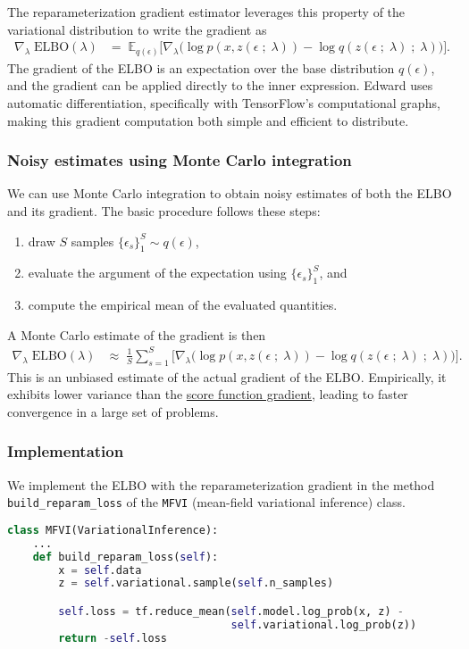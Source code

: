 The reparameterization gradient estimator leverages this property of the
variational distribution to write the gradient as
\begin{align*}
  \nabla_\lambda\;
  \text{ELBO}(\lambda)
  &=\;
  \mathbb{E}_{q(\epsilon)}
  \big[
  \nabla_\lambda
  \big(
  \log p(x, z(\epsilon \;;\; \lambda))
  -
  \log q(z(\epsilon \;;\; \lambda) \;;\;\lambda)
  \big)
  \big].
\end{align*}
The gradient of the ELBO is an expectation over the base
distribution $q(\epsilon)$, and the gradient can be applied directly
to the inner expression.
Edward uses automatic differentiation, specifically with TensorFlow's
computational graphs, making this gradient computation both simple and
efficient to distribute.

\subsubsection{Noisy estimates using Monte Carlo integration}

We can use Monte Carlo integration to obtain noisy estimates of both the ELBO
and its gradient. The basic procedure follows these steps:
\begin{enumerate}
  \item draw $S$ samples $\{\epsilon_s\}_1^S \sim q(\epsilon)$,
  \item evaluate the argument of the expectation using $\{\epsilon_s\}_1^S$, and
  \item compute the empirical mean of the evaluated quantities.
\end{enumerate}

A Monte Carlo estimate of the gradient is then
\begin{align*}
  \nabla_\lambda\;
  \text{ELBO}(\lambda)
  &\approx\;
  \frac{1}{S}
  \sum_{s=1}^{S}
  \big[
  \nabla_\lambda
  \big(
  \log p(x, z(\epsilon \;;\; \lambda))
  -
  \log q(z(\epsilon \;;\; \lambda) \;;\;\lambda)
  \big)
  \big].
\end{align*}
This is an unbiased estimate of the actual gradient of the ELBO. Empirically, it
exhibits lower variance than the
\href{tut_KLqp_score.html}{score function gradient}, leading to
faster convergence in a large set of problems.

\subsubsection{Implementation}

We implement the ELBO with the reparameterization gradient in the method
\texttt{build_reparam_loss} of the \texttt{MFVI} (mean-field variational
inference) class.
\begin{lstlisting}[language=Python]
class MFVI(VariationalInference):
    ...
    def build_reparam_loss(self):
        x = self.data
        z = self.variational.sample(self.n_samples)

        self.loss = tf.reduce_mean(self.model.log_prob(x, z) -
                                   self.variational.log_prob(z))
        return -self.loss
\end{lstlisting}

